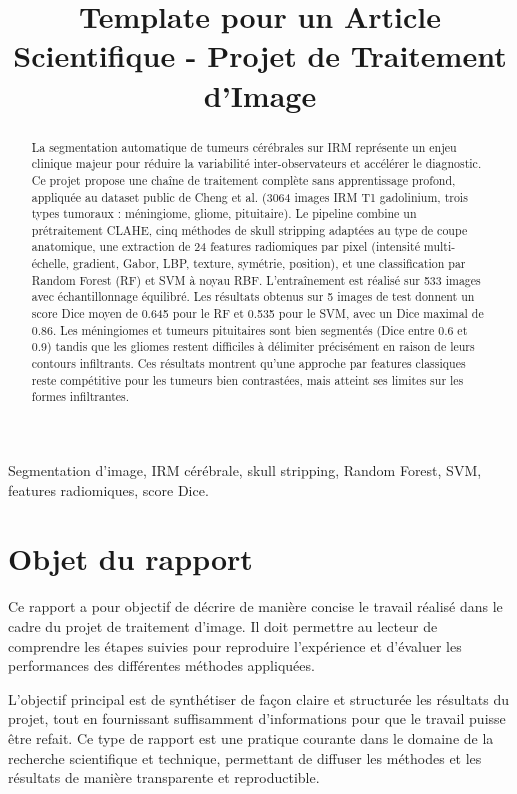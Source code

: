 \documentclass[conference]{IEEEtran}
\title{Template pour un Article Scientifique - Projet de Traitement d'Image}
\author{\IEEEauthorblockN{Arthur Loeul et Paloma Lopez}
\IEEEauthorblockA{ESEO Angers\\
Département de Traitement du Signal et Data Engineering\\
Email : arthur.lozul@reseau.eseo.fr, paloma.lopez2@reseau.eseo.fr}
}
\begin{document}
\maketitle

\begin{abstract}
La segmentation automatique de tumeurs cérébrales sur IRM représente un enjeu clinique majeur pour réduire la variabilité inter-observateurs et accélérer le diagnostic. Ce projet propose une chaîne de traitement complète sans apprentissage profond, appliquée au dataset public de Cheng et al. (3064 images IRM T1 gadolinium, trois types tumoraux : méningiome, gliome, pituitaire). 
Le pipeline combine un prétraitement CLAHE, cinq méthodes de skull stripping adaptées au type de coupe anatomique, une extraction de 24 features radiomiques par pixel (intensité multi-échelle, gradient, Gabor, LBP, texture, symétrie, position), et une classification par Random Forest (RF) et SVM à noyau RBF. L'entraînement est réalisé sur 533 images avec échantillonnage équilibré. Les résultats obtenus sur 5 images de test donnent un score Dice moyen de 0.645 pour le RF et 0.535 pour le SVM, avec un Dice maximal de 0.86. Les méningiomes et tumeurs pituitaires sont bien segmentés (Dice entre 0.6 et 0.9) tandis que les gliomes restent difficiles à délimiter précisément en raison de leurs contours infiltrants. Ces résultats montrent qu'une approche par features classiques reste compétitive pour les tumeurs bien contrastées, mais atteint ses limites sur les formes infiltrantes.\end{abstract}

\begin{IEEEkeywords}
Segmentation d'image, IRM cérébrale, skull stripping, Random Forest, SVM, features radiomiques, score Dice.
\end{IEEEkeywords}


\section*{Objet du rapport}
Ce rapport a pour objectif de décrire de manière concise le travail réalisé dans le cadre du projet de traitement d'image. Il doit permettre au lecteur de comprendre les étapes suivies pour reproduire l'expérience et d'évaluer les performances des différentes méthodes appliquées. 

L'objectif principal est de synthétiser de façon claire et structurée les résultats du projet, tout en fournissant suffisamment d’informations pour que le travail puisse être refait. Ce type de rapport est une pratique courante dans le domaine de la recherche scientifique et technique, permettant de diffuser les méthodes et les résultats de manière transparente et reproductible. 
\end{document}
